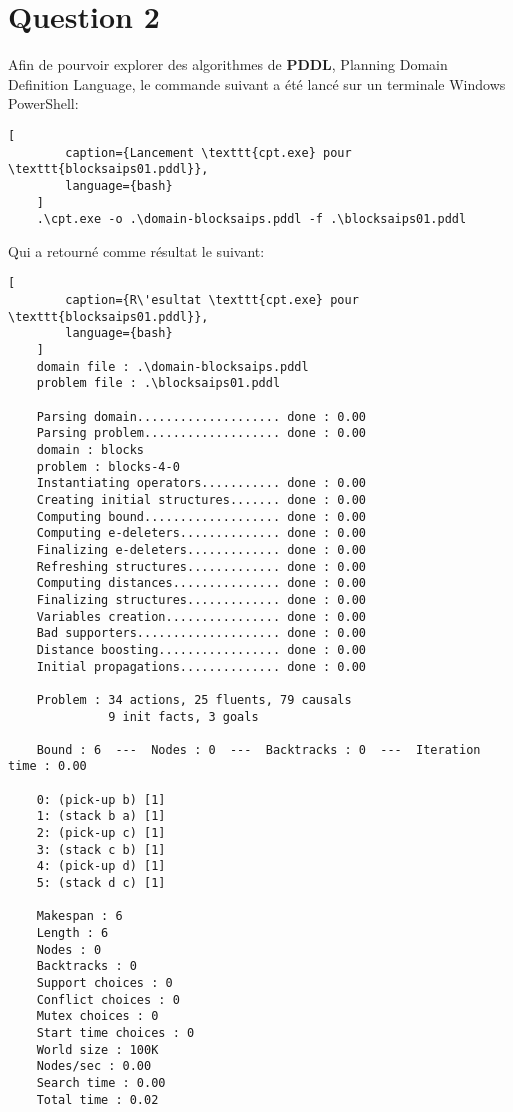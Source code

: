 \documentclass[../CSC_5RO16_TA_TP5.tex]{subfiles}
\begin{document}
\section{Question 2}
% 
\noindent Afin de pourvoir explorer des algorithmes de \textbf{PDDL}, Planning Domain Definition Language, le commande suivant a été lancé sur un terminale Windows PowerShell:

\begin{scriptsize}\mycode
	\begin{lstlisting}[
        caption={Lancement \texttt{cpt.exe} pour \texttt{blocksaips01.pddl}},
        language={bash}
    ]
    .\cpt.exe -o .\domain-blocksaips.pddl -f .\blocksaips01.pddl
    \end{lstlisting}
\end{scriptsize}

\noindent Qui a retourné comme résultat le suivant:

\begin{scriptsize}\mycode
	\begin{lstlisting}[
        caption={R\'esultat \texttt{cpt.exe} pour \texttt{blocksaips01.pddl}},
        language={bash}
    ]
    domain file : .\domain-blocksaips.pddl
    problem file : .\blocksaips01.pddl
    
    Parsing domain.................... done : 0.00
    Parsing problem................... done : 0.00
    domain : blocks
    problem : blocks-4-0
    Instantiating operators........... done : 0.00
    Creating initial structures....... done : 0.00
    Computing bound................... done : 0.00
    Computing e-deleters.............. done : 0.00
    Finalizing e-deleters............. done : 0.00
    Refreshing structures............. done : 0.00
    Computing distances............... done : 0.00
    Finalizing structures............. done : 0.00
    Variables creation................ done : 0.00
    Bad supporters.................... done : 0.00
    Distance boosting................. done : 0.00
    Initial propagations.............. done : 0.00
    
    Problem : 34 actions, 25 fluents, 79 causals
              9 init facts, 3 goals
    
    Bound : 6  ---  Nodes : 0  ---  Backtracks : 0  ---  Iteration time : 0.00
    
    0: (pick-up b) [1]
    1: (stack b a) [1]
    2: (pick-up c) [1]
    3: (stack c b) [1]
    4: (pick-up d) [1]
    5: (stack d c) [1]
    
    Makespan : 6
    Length : 6
    Nodes : 0
    Backtracks : 0
    Support choices : 0
    Conflict choices : 0
    Mutex choices : 0
    Start time choices : 0
    World size : 100K
    Nodes/sec : 0.00
    Search time : 0.00
    Total time : 0.02
	\end{lstlisting}
\end{scriptsize}
\end{document}
